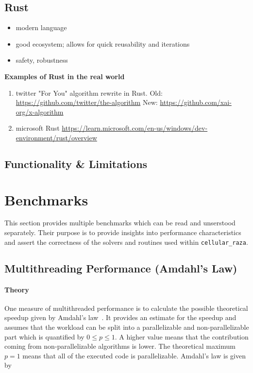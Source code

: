 \subsection{Rust}
\begin{itemize}
    \item modern language
    \item good ecosystem; allows for quick reusability and iterations
    \item safety, robustness
\end{itemize}

\textbf{Examples of Rust in the real world}
\begin{enumerate}
    \item twitter "For You" algorithm rewrite in Rust.
        Old: \url{https://github.com/twitter/the-algorithm}
        New: \url{https://github.com/xai-org/x-algorithm}
    \item microsoft Rust
        \url{https://learn.microsoft.com/en-us/windows/dev-environment/rust/overview}
\end{enumerate}

\subsection{Functionality \& Limitations}

\section{Benchmarks}
This section provides multiple benchmarks which can be read and unserstood separately.
Their purpose is to provide insights into performance characteristics and assert the correctness of
the solvers and routines used within \texttt{cellular\_raza}.

\subsection{Multithreading Performance (Amdahl's Law)}

\paragraph{Theory}
One measure of multithreaded performance is to calculate the possible theoretical speedup
given by Amdahl's law~\cite{Rodgers1985}.
It provides an estimate for the speedup and assumes that the workload can be split into a
parallelizable and non-parallelizable part which is quantified by $0\leq p \leq1$.
A higher value means that the contribution coming from non-parallelizable algorithms is lower.
The theoretical maximum $p=1$ means that all of the executed code is parallelizable.
Amdahl's law is given by

